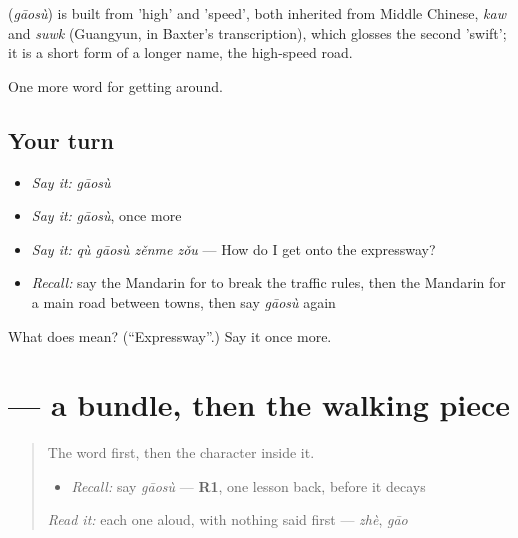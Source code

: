 \begin{cousinweb}
\textbf{} (\emph{gāosù}) is built from  'high' and  'speed', both inherited from Middle Chinese, \emph{kaw} and \emph{suwk} (Guangyun, in Baxter's transcription), which glosses the second 'swift'; it is a short form of a longer name, the high-speed road.
\end{cousinweb}

\begin{grammarlens}[title={What you've built}]
One more word for getting around.
\end{grammarlens}

\subsection*{Your turn}
\begin{itemize}
\raggedright
  \item \emph{Say it:} \emph{gāosù}
  \item \emph{Say it:} \emph{gāosù}, once more
  \item \emph{Say it:} \emph{qù gāosù zěnme zǒu} — How do I get onto the expressway?
  \item \emph{Recall:} say the Mandarin for to break the traffic rules, then the Mandarin for a main road between towns, then say \emph{gāosù} again
\end{itemize}

\begin{tcolorbox}[breakable,colback=teal!4,colframe=teal!35!black,title={Before you move on}]
What does  mean? (\textquotedblleft{}Expressway\textquotedblright{}.) Say it once more.
\end{tcolorbox}
\section[\texorpdfstring{\zh{速} (sù)}{速 (sù)}]{ — a bundle, then the walking piece}

\label{lesson:ZH-W421-su-speed}



\begin{quote}
The word first, then the character inside it.

\begin{itemize}
\raggedright
  \item \emph{Recall:} say \emph{gāosù} — \textbf{R1}, one lesson back, before it decays
\end{itemize}

\begin{quote}
 
\end{quote}

\emph{Read it:} each one aloud, with nothing said first — \emph{zhè}, \emph{gāo}
\end{quote}

